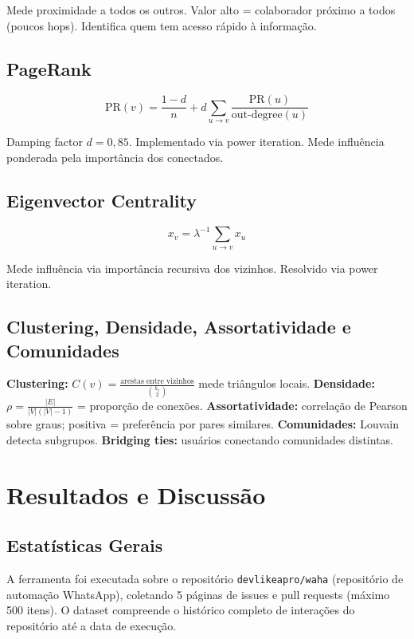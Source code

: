 \documentclass[12pt]{article}
\begin{document}
Mede proximidade a todos os outros. Valor alto = colaborador próximo a todos (poucos hops). Identifica quem tem acesso rápido à informação.

\subsection{PageRank}

\[
\text{PR}(v) = \frac{1-d}{n} + d \sum_{u \to v} \frac{\text{PR}(u)}{\text{out-degree}(u)}
\]

Damping factor $d = 0{,}85$. Implementado via power iteration. Mede influência ponderada pela importância dos conectados.

\subsection{Eigenvector Centrality}

\[
x_v = \lambda^{-1} \sum_{u \to v} x_u
\]

Mede influência via importância recursiva dos vizinhos. Resolvido via power iteration.

\subsection{Clustering, Densidade, Assortatividade e Comunidades}

\textbf{Clustering:} $C(v) = \frac{\text{arestas entre vizinhos}}{\binom{k_v}{2}}$ mede triângulos locais. \textbf{Densidade:} $\rho = \frac{|E|}{|V|(|V|-1)}$ = proporção de conexões. \textbf{Assortatividade:} correlação de Pearson sobre graus; positiva = preferência por pares similares. \textbf{Comunidades:} Louvain detecta subgrupos. \textbf{Bridging ties:} usuários conectando comunidades distintas.

\section{Resultados e Discussão}\label{sec:resultados}

\subsection{Estatísticas Gerais}

A ferramenta foi executada sobre o repositório \texttt{devlikeapro/waha} (repositório de automação WhatsApp), coletando 5 páginas de issues e pull requests (máximo 500 itens). O dataset compreende o histórico completo de interações do repositório até a data de execução.
\end{document}
